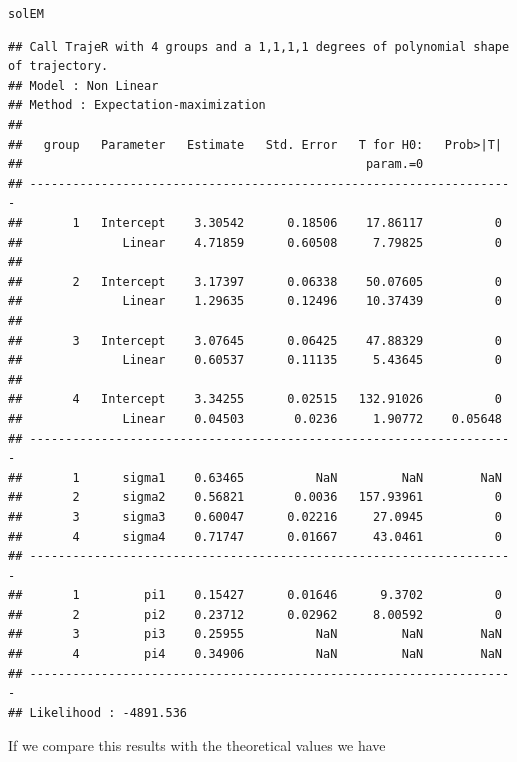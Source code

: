 \documentclass{article}\usepackage[]{graphicx}\usepackage[]{color}
\makeatletter
\newcommand{\hlstd}[1]{\textcolor[rgb]{0.345,0.345,0.345}{#1}}%
\newenvironment{kframe}{%
 \def\at@end@of@kframe{}%
 \ifinner\ifhmode%
  \def\at@end@of@kframe{\end{minipage}}%
  \begin{minipage}{\columnwidth}%
 \fi\fi%
 \def\FrameCommand##1{\hskip\@totalleftmargin \hskip-\fboxsep
 \colorbox{shadecolor}{##1}\hskip-\fboxsep
     \hskip-\linewidth \hskip-\@totalleftmargin \hskip\columnwidth}%
 \MakeFramed {\advance\hsize-\width
   \@totalleftmargin\z@ \linewidth\hsize
   \@setminipage}}%
 {\par\unskip\endMakeFramed%
 \at@end@of@kframe}
\newenvironment{knitrout}{}{} %
\makeatother
\begin{document}
\begin{knitrout}
\color{fgcolor}\begin{kframe}
\begin{alltt}
\hlstd{solEM}
\end{alltt}
\begin{verbatim}
## Call TrajeR with 4 groups and a 1,1,1,1 degrees of polynomial shape of trajectory.
## Model : Non Linear
## Method : Expectation-maximization 
##  
##   group   Parameter   Estimate   Std. Error   T for H0:   Prob>|T|  
##                                                param.=0             
## --------------------------------------------------------------------
##       1   Intercept    3.30542      0.18506    17.86117          0  
##              Linear    4.71859      0.60508     7.79825          0  
##                                                                     
##       2   Intercept    3.17397      0.06338    50.07605          0  
##              Linear    1.29635      0.12496    10.37439          0  
##                                                                     
##       3   Intercept    3.07645      0.06425    47.88329          0  
##              Linear    0.60537      0.11135     5.43645          0  
##                                                                     
##       4   Intercept    3.34255      0.02515   132.91026          0  
##              Linear    0.04503       0.0236     1.90772    0.05648  
## --------------------------------------------------------------------
##       1      sigma1    0.63465          NaN         NaN        NaN  
##       2      sigma2    0.56821       0.0036   157.93961          0  
##       3      sigma3    0.60047      0.02216     27.0945          0  
##       4      sigma4    0.71747      0.01667     43.0461          0  
## --------------------------------------------------------------------
##       1         pi1    0.15427      0.01646      9.3702          0  
##       2         pi2    0.23712      0.02962     8.00592          0  
##       3         pi3    0.25955          NaN         NaN        NaN  
##       4         pi4    0.34906          NaN         NaN        NaN  
## --------------------------------------------------------------------
## Likelihood : -4891.536
\end{verbatim}
\end{kframe}
\end{knitrout}
If we compare this results with the theoretical values we have
\end{document}
